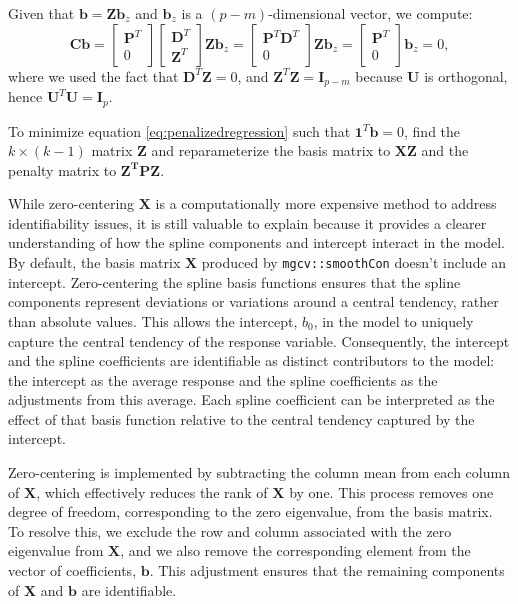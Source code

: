 \documentclass[
11pt, %
oneside, %
english, %
singlespacing, %
]{macthesis} %
\begin{document}
Given that \(\mathbf{b} = \mathbf{Z}\mathbf{b}_z\) and \(\mathbf{b}_z\) is a \((p-m)\)-dimensional vector, we compute:
\[
   \mathbf{C}\mathbf{b} = \begin{bmatrix} \mathbf{P}^T \\ 0 \end{bmatrix} \begin{bmatrix} \mathbf{D}^T \\ \mathbf{Z}^T \end{bmatrix} \mathbf{Z}\mathbf{b}_z = \begin{bmatrix} \mathbf{P}^T\mathbf{D}^T \\ 0 \end{bmatrix} \mathbf{Z}\mathbf{b}_z = \begin{bmatrix} \mathbf{P}^T \\ 0 \end{bmatrix} \mathbf{b}_z = 0,
   \]
where we used the fact that \(\mathbf{D}^T\mathbf{Z} = 0\), and \(\mathbf{Z}^T\mathbf{Z} = \mathbf{I}_{p-m}\) because \(\mathbf{U}\) is orthogonal, hence \(\mathbf{U}^T\mathbf{U} = \mathbf{I}_p\).

To minimize equation \ref{eq:penalizedregression} such that \(\mathbf{1}^T\mathbf{b} = 0\),
find the \(k \times (k-1)\) matrix \(\mathbf{Z}\) and reparameterize the basis matrix to \(\mathbf{XZ}\) and the penalty matrix to \(\mathbf{Z^TPZ}\).

While zero-centering \(\mathbf{X}\) is a computationally more expensive method to address identifiability issues, it is still valuable to explain because it provides a clearer understanding of how the spline components and intercept interact in the model. By default, the basis matrix \(\mathbf{X}\) produced by \texttt{mgcv::smoothCon} doesn't include an intercept. Zero-centering the spline basis functions ensures that the spline components represent deviations or variations around a central tendency, rather than absolute values. This allows the intercept, \(b_0\), in the model to uniquely capture the central tendency of the response variable. Consequently, the intercept and the spline coefficients are identifiable as distinct contributors to the model: the intercept as the average response and the spline coefficients as the adjustments from this average. Each spline coefficient can be interpreted as the effect of that basis function relative to the central tendency captured by the intercept.

Zero-centering is implemented by subtracting the column mean from each column of \(\mathbf{X}\), which effectively reduces the rank of \(\mathbf{X}\) by one. This process removes one degree of freedom, corresponding to the zero eigenvalue, from the basis matrix. To resolve this, we exclude the row and column associated with the zero eigenvalue from \(\mathbf{X}\), and we also remove the corresponding element from the vector of coefficients, \(\mathbf{b}\). This adjustment ensures that the remaining components of \(\mathbf{X}\) and \(\mathbf{b}\) are identifiable.
\end{document}
